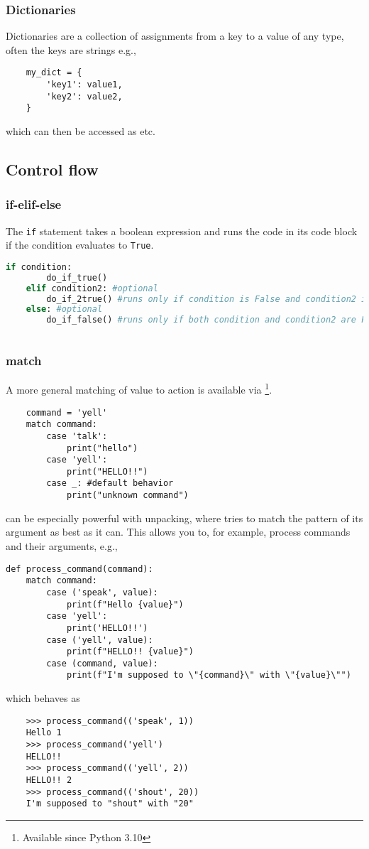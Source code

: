 \subsubsection{Dictionaries}
Dictionaries are a collection of assignments from a key to a value of any type, often the keys are strings e.g.,
\begin{lstlisting}
    my_dict = {
        'key1': value1,
        'key2': value2,
    }
\end{lstlisting}
which can then be accessed as  etc.


\subsection{Control flow}

\subsubsection{if-elif-else}
The \verb|if| statement takes a boolean expression and runs the code in its code block if the condition evaluates to \verb|True|.
\begin{lstlisting}[language=Python]
    if condition:
        do_if_true()
    elif condition2: #optional
        do_if_2true() #runs only if condition is False and condition2 is True
    else: #optional
        do_if_false() #runs only if both condition and condition2 are False
        
\end{lstlisting}

\subsubsection{match}
A more general matching of value to action is available via \footnote{Available since Python 3.10}. 
\begin{lstlisting}
    command = 'yell'
    match command:
        case 'talk':
            print("hello")
        case 'yell':
            print("HELLO!!")
        case _: #default behavior
            print("unknown command")
\end{lstlisting}

 can be especially powerful with unpacking, where  tries to match the pattern of its argument as best as it can. This allows you to, for example, process commands and their arguments, e.g.,
\begin{lstlisting}
def process_command(command):
    match command:
        case ('speak', value):
            print(f"Hello {value}")
        case 'yell':
            print('HELLO!!')
        case ('yell', value):
            print(f"HELLO!! {value}")
        case (command, value):
            print(f"I'm supposed to \"{command}\" with \"{value}\"")
\end{lstlisting}
which behaves as
\begin{lstlisting}
    >>> process_command(('speak', 1))
    Hello 1
    >>> process_command('yell')
    HELLO!!
    >>> process_command(('yell', 2))
    HELLO!! 2
    >>> process_command(('shout', 20))
    I'm supposed to "shout" with "20"
\end{lstlisting}

